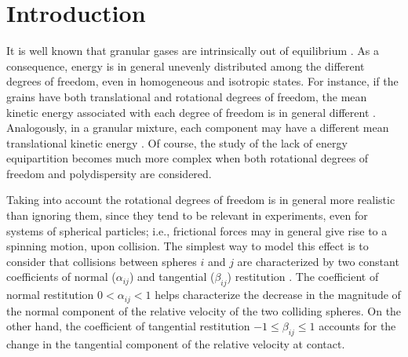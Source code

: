 \documentclass[aps,pre,reprint]{revtex4-1}
\begin{document}
\section{Introduction}
\label{sec1}
It is well known that granular gases are
intrinsically out of equilibrium \cite{BP04,RN08}. As a consequence, energy  is in general unevenly distributed among the
different degrees of freedom,
even in homogeneous and isotropic states. For instance, if the grains have both translational and
rotational degrees of freedom, the mean kinetic energy associated with each degree of
freedom is in general different
\cite{GS95,HZ97,ML98,LHMZ98,HHZ00,CLH02,GNB05,Z06,TWV11,S11a,VT12,KSG14,VSK14,VSK14b,VS15}.
Analogously, in a granular mixture,  each component may have a different mean
translational kinetic energy \cite{GD99b,WP02,FM02,DHGD02,BT02a,MG02b,BRM05}. Of
course, the study of the lack of energy equipartition becomes much more complex
when both rotational degrees of freedom and polydispersity are considered.

Taking into account the rotational degrees of freedom is in general more realistic than ignoring them,
since they tend to be relevant in experiments, even for systems of spherical
particles; i.e., frictional forces may in general give rise to a spinning
motion, upon collision. The simplest way to model this effect is to consider that
collisions between spheres $i$ and $j$ are characterized by two constant coefficients
of normal ($\alpha_{ij}$) and tangential ($\beta_{ij}$) restitution
\cite{JR85a,ZTPSH98,PZMZ02}. The  coefficient of normal restitution $0<\alpha_{ij}<1$
helps characterize the decrease in the magnitude of the normal component of the
relative velocity of the two colliding spheres. On the other hand, the coefficient of
{tangential} restitution $-1\leq\beta_{ij}\leq 1$ accounts for the change in the
tangential component of the relative velocity at contact.
\end{document}
